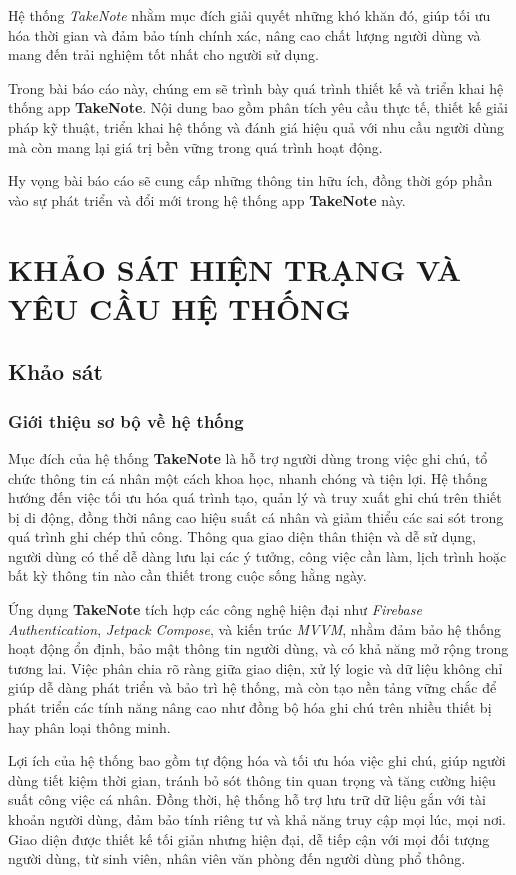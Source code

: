 \documentclass[a4paper,12pt]{article}
\begin{document}
Hệ thống \textit{TakeNote} nhằm mục đích giải quyết những khó khăn đó, giúp tối ưu hóa thời gian và đảm bảo tính chính xác, nâng cao chất lượng người dùng và mang đến trải nghiệm tốt nhất cho người sử dụng.

Trong bài báo cáo này, chúng em sẽ trình bày quá trình thiết kế và triển khai hệ thống app \textbf{TakeNote}. Nội dung bao gồm phân tích yêu cầu thực tế, thiết kế giải pháp kỹ thuật, triển khai hệ thống và đánh giá hiệu quả với nhu cầu người dùng mà còn mang lại giá trị bền vững trong quá trình hoạt động.

Hy vọng bài báo cáo sẽ cung cấp những thông tin hữu ích, đồng thời góp phần vào sự phát triển và đổi mới trong hệ thống app \textbf{TakeNote} này.

\section{KHẢO SÁT HIỆN TRẠNG VÀ YÊU CẦU HỆ THỐNG}
\subsection{Khảo sát}
\subsubsection{Giới thiệu sơ bộ về hệ thống}
Mục đích của hệ thống \textbf{TakeNote} là hỗ trợ người dùng trong việc ghi chú, tổ chức thông tin cá nhân một cách khoa học, nhanh chóng và tiện lợi. Hệ thống hướng đến việc tối ưu hóa quá trình tạo, quản lý và truy xuất ghi chú trên thiết bị di động, đồng thời nâng cao hiệu suất cá nhân và giảm thiểu các sai sót trong quá trình ghi chép thủ công. Thông qua giao diện thân thiện và dễ sử dụng, người dùng có thể dễ dàng lưu lại các ý tưởng, công việc cần làm, lịch trình hoặc bất kỳ thông tin nào cần thiết trong cuộc sống hằng ngày.

Ứng dụng \textbf{TakeNote} tích hợp các công nghệ hiện đại như \textit{Firebase Authentication}, \textit{Jetpack Compose}, và kiến trúc \textit{MVVM}, nhằm đảm bảo hệ thống hoạt động ổn định, bảo mật thông tin người dùng, và có khả năng mở rộng trong tương lai. Việc phân chia rõ ràng giữa giao diện, xử lý logic và dữ liệu không chỉ giúp dễ dàng phát triển và bảo trì hệ thống, mà còn tạo nền tảng vững chắc để phát triển các tính năng nâng cao như đồng bộ hóa ghi chú trên nhiều thiết bị hay phân loại thông minh.

Lợi ích của hệ thống bao gồm tự động hóa và tối ưu hóa việc ghi chú, giúp người dùng tiết kiệm thời gian, tránh bỏ sót thông tin quan trọng và tăng cường hiệu suất công việc cá nhân. Đồng thời, hệ thống hỗ trợ lưu trữ dữ liệu gắn với tài khoản người dùng, đảm bảo tính riêng tư và khả năng truy cập mọi lúc, mọi nơi. Giao diện được thiết kế tối giản nhưng hiện đại, dễ tiếp cận với mọi đối tượng người dùng, từ sinh viên, nhân viên văn phòng đến người dùng phổ thông.
\end{document}
